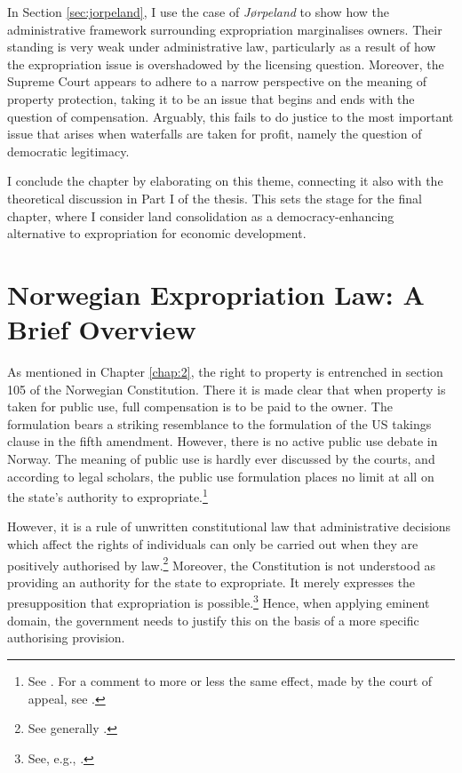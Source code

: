 In Section \ref{sec:jorpeland}, I use the case of {\it Jørpeland} to show how the administrative framework surrounding expropriation marginalises owners. Their standing is very weak under administrative law, particularly as a result of how the expropriation issue is overshadowed by the licensing question. Moreover, the Supreme Court appears to adhere to a narrow perspective on the meaning of property protection, taking it to be an issue that begins and ends with the question of compensation. Arguably, this fails to do justice to the most important issue that arises when waterfalls are taken for profit, namely the question of democratic legitimacy. 

I conclude the chapter by elaborating on this theme, connecting it also with the theoretical discussion in Part I of the thesis. This sets the stage for the final chapter, where I consider land consolidation as a democracy-enhancing alternative to expropriation for economic development.


\section{Norwegian Expropriation Law: A Brief Overview}\label{sec:explaw}

As mentioned in Chapter \ref{chap:2}, the right to property is entrenched in section 105 of the Norwegian Constitution. There it is made clear that when property is taken for public use, full compensation is to be paid to the owner. The formulation bears a striking resemblance to the formulation of the US takings clause in the fifth amendment. However, there is no active public use debate in Norway. The meaning of public use is hardly ever discussed by the courts, and according to legal scholars, the public use formulation places no limit at all on the state's authority to expropriate.\footnote{See \cite[249]{aall04}. For a comment to more or less the same effect, made by the court of appeal, see \cite{sauda09}.}

However, it is a rule of unwritten constitutional law that administrative decisions which affect the rights of individuals can only be carried out when they are positively authorised by law.\footnote{See generally \cite{hogberg11}.} Moreover, the Constitution is not understood as providing an authority for the state to expropriate. It merely expresses the presupposition that expropriation is possible.\footnote{See, e.g., \cite[6]{fleischer86}.} Hence, when applying eminent domain, the government needs to justify this on the basis of a more specific authorising provision. 

